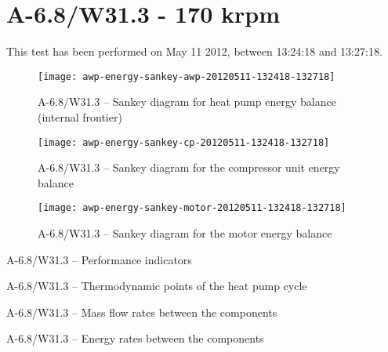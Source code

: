 
\section{A-6.8/W31.3 - 170 krpm}
\label{sec:awp-exp-details-A-6.8/W31.3}

This test has been performed on May 11\th{} 2012, between 13:24:18 and
13:27:18.

\begin{figure}[htbp]
  \centering
  \texttt{[image: awp-energy-sankey-awp-20120511-132418-132718]}
  \caption{A-6.8/W31.3 -- Sankey diagram for heat pump energy balance (internal frontier)}
  \label{fig:awp-A-6.8/W31.3-sankey-energy}
\end{figure}


\begin{figure}[htbp]
  \centering
  \texttt{[image: awp-energy-sankey-cp-20120511-132418-132718]}
  \caption{A-6.8/W31.3 -- Sankey diagram for the compressor unit energy balance}
  \label{fig:awp-A-6.8/W31.3-sankey-cp}
\end{figure}

\begin{figure}[htbp]
  \centering
  \texttt{[image: awp-energy-sankey-motor-20120511-132418-132718]}
  \caption{A-6.8/W31.3 -- Sankey diagram for the motor energy balance}
  \label{fig:awp-A-6.8/W31.3-sankey-motor}
\end{figure}

\begin{table}[htbp]
    \footnotesize
    \begin{center}
    
  \end{center}
  \caption{A-6.8/W31.3 -- Performance indicators}
\end{table}

\begin{table}[htbp]
  \footnotesize
  \begin{center}
    
  \end{center}
  \caption{A-6.8/W31.3 -- Thermodynamic points of the heat pump cycle}
\end{table}


\begin{table}[htbp]
    \footnotesize
    \begin{center}
    
  \end{center}
  \caption{A-6.8/W31.3 -- Mass flow rates between the components}
\end{table}

\begin{table}[htbp]
    \footnotesize
    \begin{center}
    
  \end{center}
  \caption{A-6.8/W31.3 -- Energy rates between the components}
\end{table}


\FloatBarrier
